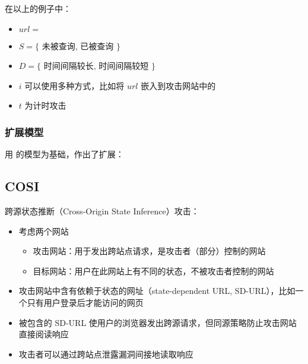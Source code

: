在以上的例子中：

\begin{itemize}
    \item $url=$ 
    \item $S=\{$  未被查询,  已被查询 $\}$
    \item $D=\{$ 时间间隔较长, 时间间隔较短 $\}$
    \item $i$ 可以使用多种方式，比如将 $url$ 嵌入到攻击网站中的 
    \item $t$ 为计时攻击
\end{itemize}

\subsubsection{扩展模型 \cite{modelext}}

\citeauthor{modelext} 用 \citeauthor{modelbase} 的模型为基础，作出了扩展：


\subsection{COSI}

跨源状态推断（Cross-Origin State Inference）攻击\cite{cosi}：

\begin{itemize}
    \item 考虑两个网站
    \begin{itemize}
        \item 攻击网站：用于发出跨站点请求，是攻击者（部分）控制的网站
        \item 目标网站：用户在此网站上有不同的状态，不被攻击者控制的网站
    \end{itemize}
    \item 攻击网站中含有依赖于状态的网址（state-dependent URL, SD-URL），比如一个只有用户登录后才能访问的网页
    \item 被包含的 SD-URL 使用户的浏览器发出跨源请求，但同源策略防止攻击网站直接阅读响应
    \item 攻击者可以通过跨站点泄露漏洞间接地读取响应
\end{itemize}